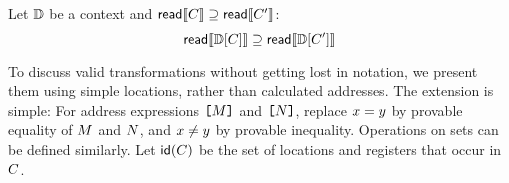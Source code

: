 \begin{lemma}%
  Let $\mathbb{D}$ be a context
and ${\mathsf{read}}\llbracket C\rrbracket \supseteq {\mathsf{read}}\llbracket C'\rrbracket$:
\begin{displaymath}
  \readc\sem{\bCtxt\hole{\aCmd}} \supseteq \readc\sem{\bCtxt\hole{\aCmd'}}
\end{displaymath}
\end{lemma}

To discuss valid transformations without getting lost in notation, we present
them using simple locations, rather than calculated addresses.  The extension
is simple: For address expressions $\texttt{[}M\texttt{]}$ and $\texttt{[}N\texttt{]}$, replace
$x=y$ by provable equality of $M$ and $N$, and
$x\neq y$ by provable inequality.  Operations on
sets can be defined similarly.
%
Let $\mathsf{id}(C)$ be the set of locations and registers that occur in $C$.

